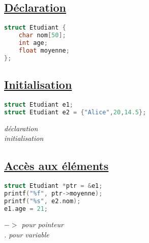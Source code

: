 \documentclass[a3paper,12pt]{article}
\begin{document}
  \begin{minipage}[t]{0.49\textwidth}
\vspace{0pt}
  \begin{tcolorbox}[title=Structures, fonttitle=\large, top=5pt, bottom=0pt, boxsep=1pt, colback=white,
  colframe=blue!45!black, 
  colbacktitle=blue!45!black,
  coltitle=white,]
  \subsection*{{\small \underline{Déclaration}}}
  \vspace{-0.5em}
  \noindent
  \begin{lstlisting}[language=C, basicstyle=\normalsize, aboveskip=0pt, belowskip=0pt]
struct Etudiant {
    char nom[50];
    int age;
    float moyenne;
};
  \end{lstlisting}
  \vspace{-1em}
\subsection*{{\small \underline{Initialisation}}}
\vspace{-1.25em}
\noindent
\begin{minipage}[t]{0.5\textwidth} 
\begin{lstlisting}[language=C, basicstyle=\normalsize, aboveskip=0pt, belowskip=0pt]
struct Etudiant e1;
struct Etudiant e2 = {"Alice",20,14.5};
\end{lstlisting}
\end{minipage}%
\hspace{9em}
\begin{minipage}[t]{0.45\textwidth}
\vspace{0.15em}
 \textit{déclaration}\\
 \textit{initialisation}
\end{minipage}
\vspace{-1em}
\subsection*{{\small \underline{Accès aux éléments}}}
\vspace{-1.25em}
\begin{minipage}[t]{0.5\textwidth} 
\begin{lstlisting}[language=C, basicstyle=\normalsize, aboveskip=0pt, belowskip=0pt]
struct Etudiant *ptr = &e1;
printf("%f", ptr->moyenne);
printf("%s", e2.nom);
e1.age = 21;
\end{lstlisting}
\end{minipage}%
\hspace{6em}
\begin{minipage}[t]{0.45\textwidth}
\vspace{0.15em}
 \textit{ $->$ pour pointeur}\\
 \textit{. pour variable}
\end{minipage}
\vspace{-1em}

\end{tcolorbox}
\end{minipage}
\end{document}
